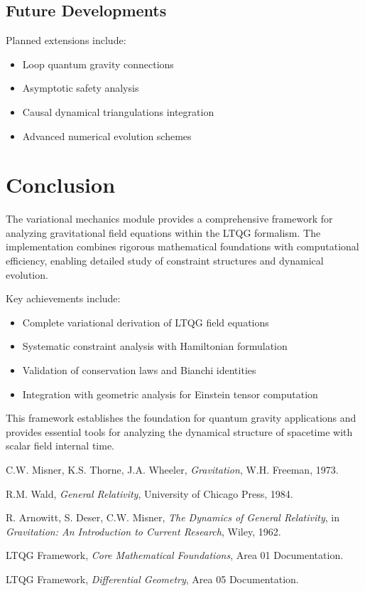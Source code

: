 \documentclass[11pt,a4paper]{article}
\theoremstyle{definition}
\theoremstyle{remark}
\begin{document}
\subsection{Future Developments}

Planned extensions include:
\begin{itemize}
\item Loop quantum gravity connections
\item Asymptotic safety analysis
\item Causal dynamical triangulations integration
\item Advanced numerical evolution schemes
\end{itemize}

\section{Conclusion}

The variational mechanics module provides a comprehensive framework for analyzing gravitational field equations within the LTQG formalism. The implementation combines rigorous mathematical foundations with computational efficiency, enabling detailed study of constraint structures and dynamical evolution.

Key achievements include:
\begin{itemize}
\item Complete variational derivation of LTQG field equations
\item Systematic constraint analysis with Hamiltonian formulation
\item Validation of conservation laws and Bianchi identities
\item Integration with geometric analysis for Einstein tensor computation
\end{itemize}

This framework establishes the foundation for quantum gravity applications and provides essential tools for analyzing the dynamical structure of spacetime with scalar field internal time.

\begin{thebibliography}{10}

 C.W. Misner, K.S. Thorne, J.A. Wheeler, \textit{Gravitation}, W.H. Freeman, 1973.

 R.M. Wald, \textit{General Relativity}, University of Chicago Press, 1984.

 R. Arnowitt, S. Deser, C.W. Misner, \textit{The Dynamics of General Relativity}, in \textit{Gravitation: An Introduction to Current Research}, Wiley, 1962.

 LTQG Framework, \textit{Core Mathematical Foundations}, Area 01 Documentation.

 LTQG Framework, \textit{Differential Geometry}, Area 05 Documentation.

\end{thebibliography}
\end{document}
